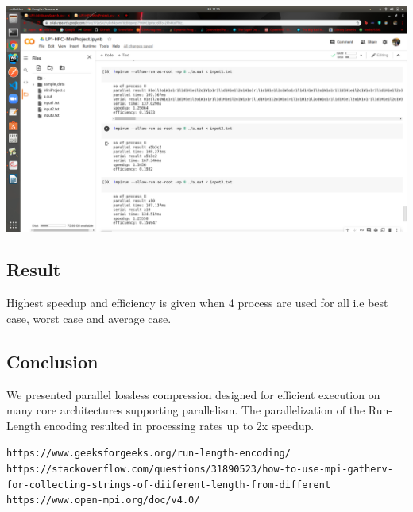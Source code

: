 \documentclass[a4paper, 12pt]{article}
\begin{document}
\par
\begin{center}
    \includegraphics[width=\linewidth]{8_.png}
\end{center}
\newpage
\begin{center}
\section{Result}
\end{center}
 Highest speedup and efficiency is given when 4 process are used for all i.e best case, worst case and
average case.
\newpage
\begin{center}
\section{Conclusion}
\end{center}
We presented parallel lossless compression designed for efficient execution on many core architectures
supporting parallelism. The parallelization of the Run-Length encoding resulted in processing rates up to
2x speedup.

\newpage
\begin{thebibliography}{1}
\texttt{https://www.geeksforgeeks.org/run-length-encoding/}
\texttt{https://stackoverflow.com/questions/31890523/how-to-use-mpi-gatherv-for-collecting-strings-of-diiferent-length-from-different}
\texttt{https://www.open-mpi.org/doc/v4.0/}
\end{thebibliography}
\end{document}
